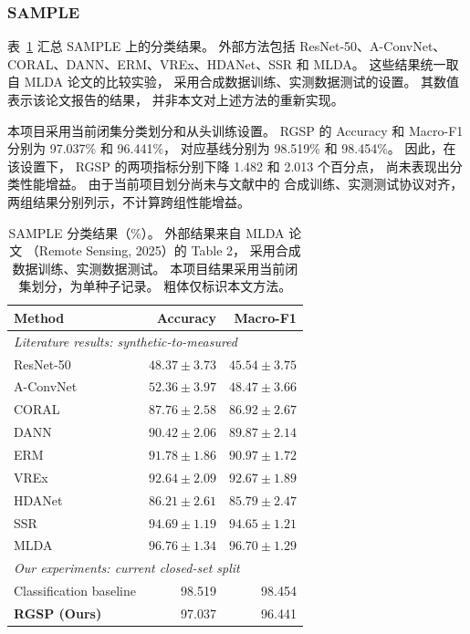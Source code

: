 \documentclass[journal]{IEEEtran}
\begin{document}
\subsubsection{SAMPLE}
\label{sec:sample_results}

表~\ref{tab:sample_comparison}
汇总 SAMPLE 上的分类结果。
外部方法包括 ResNet-50、A-ConvNet、
CORAL、DANN、ERM、VREx、HDANet、SSR 和 MLDA。
这些结果统一取自 MLDA 论文的比较实验，
采用合成数据训练、实测数据测试的设置。
其数值表示该论文报告的结果，
并非本文对上述方法的重新实现。

本项目采用当前闭集分类划分和从头训练设置。
RGSP 的 Accuracy 和 Macro-F1
分别为 97.037\% 和 96.441\%，
对应基线分别为 98.519\% 和 98.454\%。
因此，在该设置下，
RGSP 的两项指标分别下降
1.482 和 2.013 个百分点，
尚未表现出分类性能增益。
由于当前项目划分尚未与文献中的
合成训练、实测测试协议对齐，
两组结果分别列示，不计算跨组性能增益。

\begin{table}[!tbp]
\centering
\small
\setlength{\tabcolsep}{3pt}
\caption{SAMPLE 分类结果（\%）。
外部结果来自 MLDA 论文
（Remote Sensing, 2025）的 Table 2，
采用合成数据训练、实测数据测试。
本项目结果采用当前闭集划分，为单种子记录。
粗体仅标识本文方法。}
\label{tab:sample_comparison}
\begin{tabular}{lrr}
\toprule
Method & Accuracy & Macro-F1 \\
\midrule
\multicolumn{3}{l}{
\textit{Literature results: synthetic-to-measured}} \\
ResNet-50
& $48.37 \pm 3.73$ & $45.54 \pm 3.75$ \\
A-ConvNet
& $52.36 \pm 3.97$ & $48.47 \pm 3.66$ \\
CORAL
& $87.76 \pm 2.58$ & $86.92 \pm 2.67$ \\
DANN
& $90.42 \pm 2.06$ & $89.87 \pm 2.14$ \\
ERM
& $91.78 \pm 1.86$ & $90.97 \pm 1.72$ \\
VREx
& $92.64 \pm 2.09$ & $92.67 \pm 1.89$ \\
HDANet
& $86.21 \pm 2.61$ & $85.79 \pm 2.47$ \\
SSR
& $94.69 \pm 1.19$ & $94.65 \pm 1.21$ \\
MLDA
& $96.76 \pm 1.34$ & $96.70 \pm 1.29$ \\

\midrule
\multicolumn{3}{l}{
\textit{Our experiments: current closed-set split}} \\
Classification baseline
& 98.519 & 98.454 \\
\textbf{RGSP (Ours)}
& 97.037 & 96.441 \\
\bottomrule
\end{tabular}
\end{table}
\end{document}
